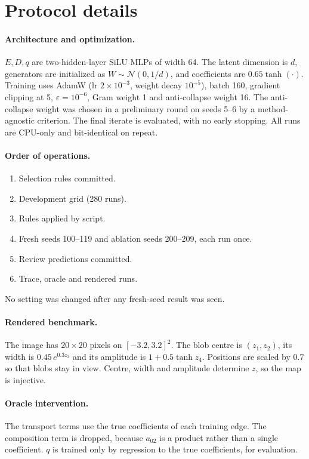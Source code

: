 

\section{Protocol details}\label{app:protocol}
\paragraph{Architecture and optimization.}
$E,D,q$ are two-hidden-layer SiLU MLPs of width 64. The latent dimension is $d$, generators are initialized as
$W\sim\mathcal N(0,1/d)$, and coefficients are $0.65\tanh(\cdot)$. Training uses AdamW (lr $2\times10^{-3}$, weight
decay $10^{-5}$), batch 160, gradient clipping at 5, $\varepsilon=10^{-6}$, Gram weight 1 and anti-collapse weight 16.
The anti-collapse weight was chosen in a preliminary round on seeds 5--6 by a method-agnostic criterion. The final
iterate is evaluated, with no early stopping. All runs are CPU-only and bit-identical on repeat.

\paragraph{Order of operations.}
\begin{enumerate}
\item Selection rules committed.
\item Development grid (280 runs).
\item Rules applied by script.
\item Fresh seeds 100--119 and ablation seeds 200--209, each run once.
\item Review predictions committed.
\item Trace, oracle and rendered runs.
\end{enumerate}
No setting was changed after any fresh-seed result was seen.

\paragraph{Rendered benchmark.}
The image has $20\times20$ pixels on $[-3.2,3.2]^2$. The blob centre is $(z_1,z_2)$, its width is
$0.45\,e^{0.3z_3}$ and its amplitude is $1+0.5\tanh z_4$. Positions are scaled by $0.7$ so that blobs stay in view.
Centre, width and amplitude determine $z$, so the map is injective.

\paragraph{Oracle intervention.}
The transport terms use the true coefficients of each training edge. The composition term is dropped, because
$a_{02}$ is a product rather than a single coefficient. $q$ is trained only by regression to the true coefficients,
for evaluation.

